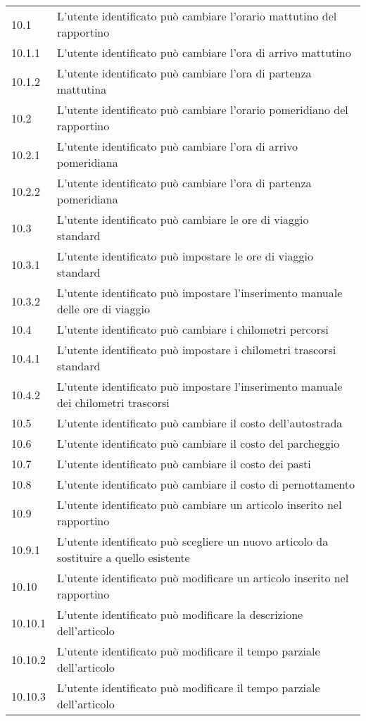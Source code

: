 \begin{longtable}{||p{} p{10.55cm}||}
		10.1 & L’utente identificato può cambiare l’orario mattutino del rapportino\\
		10.1.1 & L’utente identificato può cambiare l’ora di arrivo mattutino\\
		10.1.2 & L’utente identificato può cambiare l’ora di partenza mattutina\\
		10.2 & L’utente identificato può cambiare l’orario pomeridiano del rapportino\\
		10.2.1 & L’utente identificato può cambiare l’ora di arrivo pomeridiana\\
		10.2.2 & L’utente identificato può cambiare l’ora di partenza pomeridiana\\
		10.3 & L’utente identificato può cambiare le ore di viaggio standard\\
		10.3.1 & L’utente identificato può impostare le ore di viaggio standard\\
		10.3.2 & L’utente identificato può impostare l’inserimento manuale delle ore di viaggio\\
		10.4 & L’utente identificato può cambiare i chilometri percorsi\\
		10.4.1 & L’utente identificato può impostare i chilometri trascorsi standard\\
		10.4.2 & L’utente identificato può impostare l’inserimento manuale dei chilometri trascorsi\\
		10.5 & L’utente identificato può cambiare il costo dell’autostrada\\
		10.6 & L’utente identificato può cambiare il costo del parcheggio\\
		10.7 & L’utente identificato può cambiare il costo dei pasti\\
		10.8 & L’utente identificato può cambiare il costo di pernottamento\\
		10.9 & L’utente identificato può cambiare un articolo inserito nel rapportino\\
		10.9.1 & L’utente identificato può scegliere un nuovo articolo da sostituire a quello esistente\\
		10.10 & L’utente identificato può modificare un articolo inserito nel rapportino\\
		10.10.1 & L’utente identificato può modificare la descrizione dell’articolo\\
		10.10.2 & L’utente identificato può modificare il tempo parziale dell’articolo\\
		10.10.3 & L’utente identificato può modificare il tempo parziale dell’articolo\\

\end{longtable}

